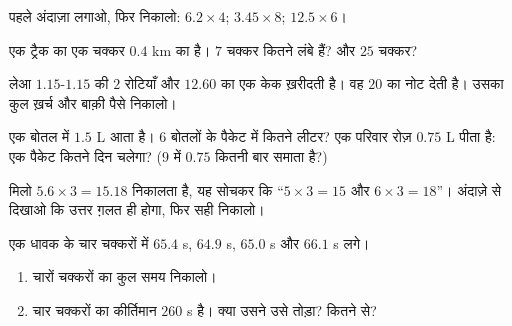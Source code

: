\begin{exercise}[$\star$]\label{exo:g5:decimalops:6}
पहले अंदाज़ा लगाओ, फिर निकालो: $6.2 \times 4$; \quad
$3.45 \times 8$; \quad $12.5 \times 6$।
\end{exercise}

\begin{exercise}[$\star$]\label{exo:g5:decimalops:7}
एक ट्रैक का एक चक्कर $0.4$ km का है। $7$ चक्कर कितने लंबे हैं?
और $25$ चक्कर?
\end{exercise}

\begin{exercise}[$\star$]\label{exo:g5:decimalops:8}
लेआ $1.15$-$1.15$ की $2$ रोटियाँ और $12.60$ का एक केक ख़रीदती
है। वह $20$ का नोट देती है। उसका कुल ख़र्च और बाक़ी पैसे निकालो।
\end{exercise}

\begin{exercise}[$\star$]\label{exo:g5:decimalops:9}
एक बोतल में $1.5$ L आता है। $6$ बोतलों के पैकेट में कितने लीटर?
एक परिवार रोज़ $0.75$ L पीता है: एक पैकेट कितने दिन चलेगा?
($9$ में $0.75$ कितनी बार समाता है?)
\end{exercise}

\begin{exercise}[$\star\star$]\label{exo:g5:decimalops:10}
मिलो $5.6 \times 3 = 15.18$ निकालता है, यह सोचकर कि
``$5 \times 3 = 15$ और $6 \times 3 = 18$''। अंदाज़े से दिखाओ कि
उत्तर ग़लत ही होगा, फिर सही निकालो।
\end{exercise}

\begin{exercise}[$\star\star$]\label{exo:g5:decimalops:11}
एक धावक के चार चक्करों में $65.4$ s, $64.9$ s, $65.0$ s और
$66.1$ s लगे।
\begin{enumerate}
  \item चारों चक्करों का कुल समय निकालो।
  \item चार चक्करों का कीर्तिमान $260$ s है। क्या उसने उसे
        तोड़ा? कितने से?
\end{enumerate}
\end{exercise}
